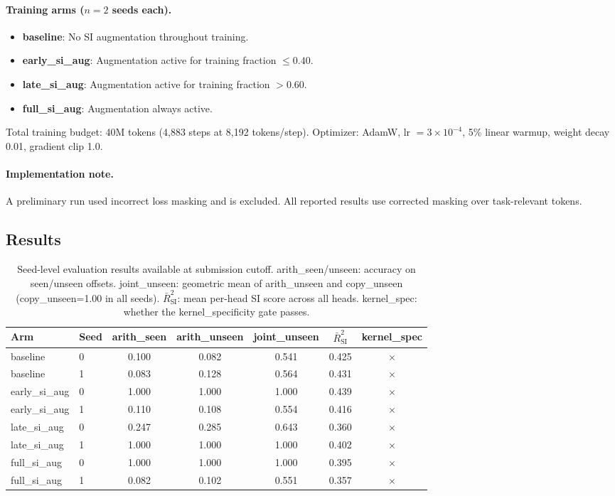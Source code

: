 \documentclass{article}
\begin{document}
\paragraph{Training arms ($n{=}2$ seeds each).}
\begin{itemize}
    \item \textbf{baseline}: No SI augmentation throughout training.
    \item \textbf{early\_si\_aug}: Augmentation active for training fraction $\leq 0.40$.
    \item \textbf{late\_si\_aug}: Augmentation active for training fraction $> 0.60$.
    \item \textbf{full\_si\_aug}: Augmentation always active.
\end{itemize}
Total training budget: 40M tokens (4,883 steps at 8,192 tokens/step). Optimizer: AdamW, lr $= 3{\times}10^{-4}$, 5\% linear warmup, weight decay 0.01, gradient clip 1.0.

\paragraph{Implementation note.} A preliminary run used incorrect loss masking and is excluded. All reported results use corrected masking over task-relevant tokens.

\subsection{Results}

\begin{table}[htbp]
\centering
\small
\caption{Seed-level evaluation results available at submission cutoff. arith\_seen/unseen: accuracy on seen/unseen offsets. joint\_unseen: geometric mean of arith\_unseen and copy\_unseen (copy\_unseen=1.00 in all seeds). $\bar{R}^2_{\mathrm{SI}}$: mean per-head SI score across all heads. kernel\_spec: whether the kernel\_specificity gate passes.}
\label{tab:e23_results}
\begin{tabular}{llccccc}
\toprule
Arm & Seed & arith\_seen & arith\_unseen & joint\_unseen & $\bar{R}^2_{\mathrm{SI}}$ & kernel\_spec \\
\midrule
baseline      & 0 & 0.100 & 0.082 & 0.541 & 0.425 & $\times$ \\
baseline      & 1 & 0.083 & 0.128 & 0.564 & 0.431 & $\times$ \\
early\_si\_aug & 0 & 1.000 & 1.000 & 1.000 & 0.439 & $\times$ \\
early\_si\_aug & 1 & 0.110 & 0.108 & 0.554 & 0.416 & $\times$ \\
late\_si\_aug  & 0 & 0.247 & 0.285 & 0.643 & 0.360 & $\times$ \\
late\_si\_aug  & 1 & 1.000 & 1.000 & 1.000 & 0.402 & $\times$ \\
full\_si\_aug  & 0 & 1.000 & 1.000 & 1.000 & 0.395 & $\times$ \\
full\_si\_aug  & 1 & 0.082 & 0.102 & 0.551 & 0.357 & $\times$ \\
\bottomrule
\end{tabular}
\end{table}
\end{document}
